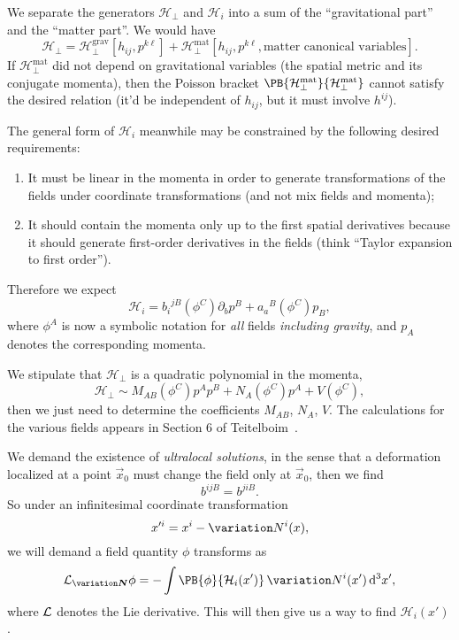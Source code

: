 We separate the generators $\mathcal{H}_{\bot}$ and $\mathcal{H}_{i}$
into a sum of the ``gravitational part'' and the ``matter part''. We
would have
\begin{equation}
\mathcal{H}_{\bot} = \mathcal{H}_{\bot}^{\text{grav}}[h_{ij},p^{k\ell}]
+ \mathcal{H}_{\bot}^{\text{mat}}[h_{ij},p^{k\ell},\mbox{matter canonical variables}].
\end{equation}
If $\mathcal{H}_{\bot}^{\text{mat}}$ did not depend on gravitational
variables (the spatial metric and its conjugate momenta), then the
Poisson bracket
$\PB{\mathcal{H}_{\bot}^{\text{mat}}}{\mathcal{H}_{\bot}^{\text{mat}}}$
cannot satisfy the desired relation (it'd be independent of $h_{ij}$,
but it must involve $h^{ij}$).

\M
The general form of $\mathcal{H}_{i}$ meanwhile may be constrained by
the following desired requirements:
\begin{enumerate}
\item It must be linear in the momenta in order to generate
  transformations of the fields under coordinate transformations (and
  not mix fields and momenta);
\item It should contain the momenta only up to the first spatial
  derivatives because it should generate first-order derivatives in the
  fields (think ``Taylor expansion to first order'').
\end{enumerate}
Therefore we expect
\begin{equation}
\mathcal{H}_{i}={b_{i}}^{jB}(\phi^{C})\partial_{b}p^{B} + {a_{a}}^{B}(\phi^{C})p_{B},
\end{equation}
where $\phi^{A}$ is now a symbolic notation for \emph{all} fields
\emph{including gravity}, and $p_{A}$ denotes the corresponding momenta.

We stipulate that $\mathcal{H}_{\bot}$ is a quadratic polynomial in the
momenta,
\begin{equation}
\mathcal{H}_{\bot}\sim M_{AB}(\phi^{C})p^{A}p^{B} + N_{A}(\phi^{C})p^{A} + V(\phi^{C}),
\end{equation}
then we just need to determine the coefficients $M_{AB}$, $N_{A}$, $V$.
The calculations for the various fields appears in Section 6 of
Teitelboim~\cite{Teitelboim:1980hs}. 

We demand the existence of \emph{ultralocal solutions}, in the sense
that a deformation localized at a point $\vec{x}_{0}$ must change the
field only at $\vec{x}_{0}$, then we find
\begin{equation}
b^{ijB}=b^{jiB}.
\end{equation}
So under an infinitesimal coordinate transformation
\begin{equation}
x'^{i} = x^{i} - \variation N^{i}(x),
\end{equation}
we will demand a field quantity $\phi$ transforms as
\begin{equation}
\LieD_{\variation\vec{N}}\phi =
-\int\PB{\phi}{\mathcal{H}_{i}(x')}\,\variation N^{i}(x')\,\D^{3}x',
\end{equation}
where $\mathcal{L}$ denotes the Lie derivative.
This will then give us a way to find $\mathcal{H}_{i}(x')$.

